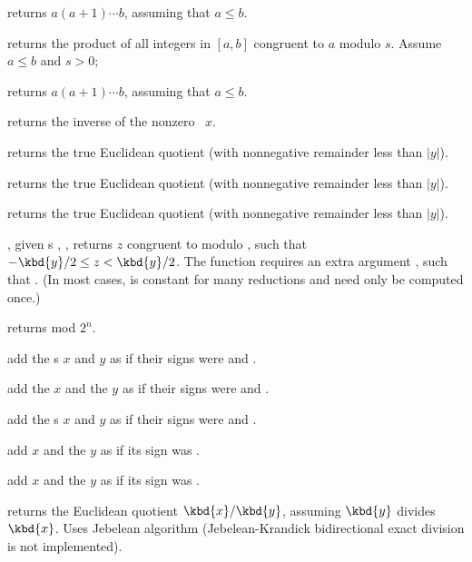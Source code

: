  returns $a(a+1)\cdots b$, assuming
that $a \leq b$.

 returns the product
of all integers in $[a,b]$ congruent to $a$ modulo $s$. Assume $a\leq b$ and
$s > 0$;

 returns $a(a+1)\cdots b$, assuming
that $a \leq b$.

 returns the inverse of the nonzero ~$x$.

 returns the true Euclidean quotient
(with nonnegative remainder less than $|y|$).

 returns the true Euclidean quotient
(with nonnegative remainder less than $|y|$).

 returns the true Euclidean quotient
(with nonnegative remainder less than $|y|$).

, given
s , , returns $z$ congruent to  modulo ,
such that $-\kbd{y}/2 \leq z < \kbd{y}/2$. The function requires an extra
argument , such that . (In most cases, 
is constant for many reductions and  need only be computed once.)

 returns  mod $2^n$.

 add the s
$x$ and $y$ as if their signs were  and .

add the  $x$ and the  $y$ as if their signs were 
and .

 add the s $x$
and $y$ as if their signs were  and .

 add $x$ and the  $y$
as if its sign was .

 add $x$ and the  $y$
as if its sign was .


 returns the Euclidean quotient
$\kbd{x} / \kbd{y}$, assuming $\kbd{y}$ divides $\kbd{x}$. Uses Jebelean
algorithm (Jebelean-Krandick bidirectional exact division is not
implemented).


